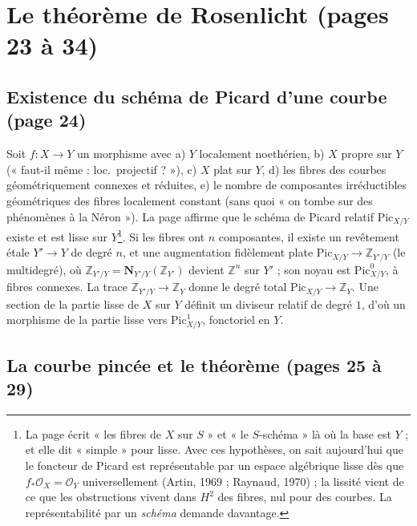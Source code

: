 \documentclass[11pt,a4paper]{article}
\begin{document}
\section*{Le théorème de Rosenlicht (pages 23 à 34)}

\subsection*{Existence du schéma de Picard d'une courbe (page 24)}

Soit $f : X \to Y$ un morphisme avec a) $Y$ localement noethérien, b) $X$ propre
sur $Y$ (« faut-il même : loc.\ projectif ? »), c) $X$ plat sur $Y$, d) les fibres
des courbes géométriquement connexes et réduites, e) le nombre de composantes
irréductibles géométriques des fibres localement constant (sans quoi « on tombe
sur des phénomènes à la Néron »). La page affirme que le schéma de Picard relatif
$\mathrm{Pic}_{X/Y}$ existe et est lisse sur $Y$\footnote{La page écrit « les
fibres de $X$ sur $S$ » et « le $S$-schéma » là où la base est $Y$ ; et elle dit
« simple » pour lisse. Avec ces hypothèses, on sait aujourd'hui que le foncteur de
Picard est représentable par un espace algébrique lisse dès que $f_*\mathcal{O}_X
= \mathcal{O}_Y$ universellement (Artin, 1969 ; Raynaud, 1970) ; la lissité vient
de ce que les obstructions vivent dans $H^2$ des fibres, nul pour des courbes. La
représentabilité par un \emph{schéma} demande davantage.}. Si les fibres ont $n$
composantes, il existe un revêtement étale $Y' \to Y$ de degré $n$, et
une augmentation fidèlement plate $\mathrm{Pic}_{X/Y} \to \mathbb{Z}_{Y'/Y}$ (le
multidegré), où $\mathbb{Z}_{Y'/Y} = \mathbf{N}_{Y'/Y}(\mathbb{Z}_{Y'})$ devient
$\mathbb{Z}^n$ sur $Y'$ ; son noyau est $\mathrm{Pic}^0_{X/Y}$, à fibres connexes.
La trace $\mathbb{Z}_{Y'/Y} \to \mathbb{Z}_Y$ donne le degré total
$\mathrm{Pic}_{X/Y} \to \mathbb{Z}_Y$. Une section de la partie lisse de $X$ sur
$Y$ définit un diviseur relatif de degré $1$, d'où un morphisme de la partie
lisse vers $\mathrm{Pic}^1_{X/Y}$, fonctoriel en $Y$.

\subsection*{La courbe pincée et le théorème (pages 25 à 29)}
\end{document}
